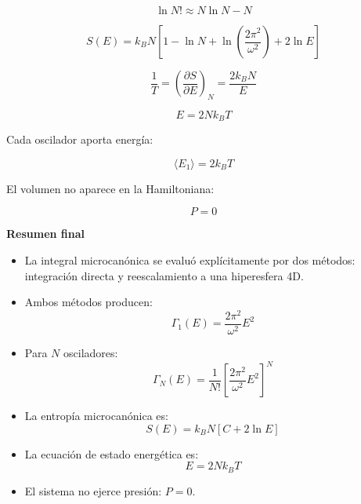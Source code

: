 \documentclass{article}
\begin{document}
\[
\ln N!\approx N\ln N - N
\]

\[
\boxed{
S(E) = k_{B}N
\left[
1 - \ln N
+ \ln\left(\frac{2\pi^{2}}{\omega^{2}}\right)
+ 2\ln E
\right]
}
\]


\[
\frac{1}{T}
=
\left(\frac{\partial S}{\partial E}\right)_{N}
=
\frac{2k_{B}N}{E}
\]

\[
\boxed{
E = 2Nk_{B}T
}
\]

Cada oscilador aporta energía:

\[
\boxed{
\langle E_{1}\rangle = 2k_{B}T
}
\]

El volumen no aparece en la Hamiltoniana:

\[
\boxed{
P=0
}
\]

\vspace{0.4cm}

\textcolor{Tarawera}{\textbf{Resumen final}}

\begin{itemize}
  \item La integral microcanónica se evaluó explícitamente por dos métodos:
        integración directa y reescalamiento a una hiperesfera 4D.
  \item Ambos métodos producen:
        \[
        \Gamma_{1}(E)=\frac{2\pi^{2}}{\omega^{2}}E^{2}
        \]
  \item Para \(N\) osciladores:
        \[
        \Gamma_{N}(E)=\frac{1}{N!}\left[\frac{2\pi^{2}}{\omega^{2}}E^{2}\right]^{N}
        \]
  \item La entropía microcanónica es:
        \[
        S(E)=k_{B}N\left[C+2\ln E\right]
        \]
  \item La ecuación de estado energética es:
        \[
        E=2Nk_{B}T
        \]
  \item El sistema no ejerce presión: \(P=0\).
\end{itemize}





\end{document}
